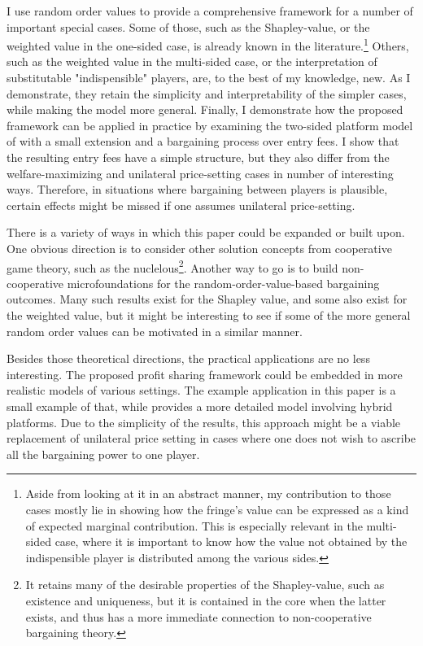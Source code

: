 \documentclass[a4paper]{article}
\begin{document}
I use random order values to provide a comprehensive framework for a number of important special cases.
Some of those, such as the Shapley-value, or the weighted value in the one-sided case, is already known in the literature.\footnote{
    Aside from looking at it in an abstract manner, my contribution to those cases mostly lie in showing how the fringe's value can be expressed as a kind of expected marginal contribution.
    This is especially relevant in the multi-sided case, where it is important to know how the value not obtained by the indispensible player is distributed among the various sides.
}
Others, such as the weighted value in the multi-sided case, or the interpretation of substitutable "indispensible" players, are, to the best of my knowledge, new.
As I demonstrate, they retain the simplicity and interpretability of the simpler cases, while making the model more general.
Finally, I demonstrate how the proposed framework can be applied in practice by
examining the two-sided platform model of \textcite{armstrong2006competition} with a small extension and a bargaining process over entry fees.
I show that the resulting entry fees have a simple structure, but they also differ from the welfare-maximizing and unilateral price-setting cases in number of interesting ways.
Therefore, in situations where bargaining between players is plausible, certain effects might be missed if one assumes unilateral price-setting.

There is a variety of ways in which this paper could be expanded or built upon.
One obvious direction is to consider other solution concepts from cooperative game theory, such as the nuclelous\footnote{
    It retains many of the desirable properties of the Shapley-value, such as existence and uniqueness, but it is contained in the core when the latter exists, and thus has a more immediate connection to non-cooperative bargaining theory.
}.
Another way to go is to build non-cooperative microfoundations for the random-order-value-based bargaining outcomes.
Many such results exist for the Shapley value, and some also exist for the weighted value, but it might be interesting to see if some of the more general random order values can be motivated in a similar manner.

Besides those theoretical directions, the practical applications are no less interesting.
The proposed profit sharing framework could be embedded in more realistic models of various settings.
The example application in this paper is a small example of that, while \textcite{stancsics2023hybrid} provides a more detailed model involving hybrid platforms.
Due to the simplicity of the results, this approach might be a viable replacement of unilateral price setting in cases where one does not wish to ascribe all the bargaining power to one player.
\end{document}
